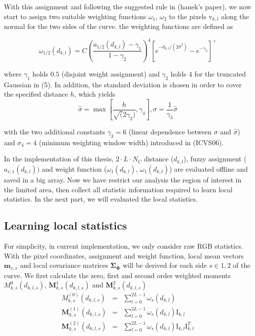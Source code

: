 With this assignment and following the suggested rule in (hanek's
paper), we now start to assign two suitable weighting functions
$\omega_1$, $\omega_2$ to the pixels $\mathrm{v}_{k,l}$ along the
normal for the two sides of the curve. the weighting functions are
defined as

\begin{equation}
  \label{eq:5.10}
  \omega_{1/2}(d_{k,l}) = C\left(\frac{a_{1/2}(d_{k,l}) -
    \gamma_1}{1-\gamma_2}\right)^4 \left[e^{-d_{k,l}/(2\hat{\sigma}^2)} - e^{-\gamma_2}\right]^+
\end{equation}

where $\gamma_1$ holds $0.5$ (disjoint weight assignment) and $\gamma_2$
holds $4$ for the truncated Gaussian in (5). In addition, the standard
deviation is chosen in order to cover the specified distance $h$,
which yields 
\begin{equation}
  \label{eq:5.11}
  \hat{\sigma} = \max \left[\frac{h}{\sqrt(2\gamma_2)}, \gamma_4
  \right], \sigma  = \frac{1}{\gamma_3} \hat{\sigma}
\end{equation}

with the two additional constants $\gamma_3 = 6$ (linear dependence
between $\sigma$ and $\hat{\sigma}$) and $\sigma_4 = 4$ (minimum
weighting window width) introduced in (ICVS06). 

In the implementation of this thesis,
$2 \cdot L \cdot N_C$ distance ($d_{k,l}$), fuzzy assignment
($a_{v,1}(d_{k,l}))$ and weight function ($\omega_1(d_{k,l})$,
$\omega_1(d_{k,l})$) are evaluated offline and saved in a big
array. Now we have restrict our analysis the region of interest in the
limited area, then collect all statistic information required to learn
local statistics. In the next part, we will evaluated the local
statistics.

\subsection{Learning local statistics}
\label{sec:lls}

For simplicity, in current implementation, we only consider raw RGB
statistics. With the pixel coordinates, assignment and weight
function, local mean vectors $\mathbf{m}_{v,s}$  and local covariance matrices
$\mathbf{\Sigma}_{\mathbf{\Phi}}$ will be derived for each side $s \in
{1,2}$ of the curve.
We first calculate the zero, first and second order weighted moments
$M_{k,s}^0(d_{k,l,s})$, $\mathbf{M}_{k,s}^1(d_{k,l,s})$ and $\mathbf{M}_{k,s}^2(d_{k,l,s})$
\begin{eqnarray}
  \label{eq:5.13}
  M_{k,s}^{(0)}(d_{k,l,s}) &=& \sum_{l=0}^{2L-1} \omega_s(d_{k,l})\\
  \mathbf{M}_{k,s}^{(1)}(d_{k,l,s}) &=& \sum_{l=0}^{2L-1} \omega_s(d_{k,l}) \mathrm{I}_{k,l}\\
  \mathbf{M}_{k,s}^{(2)}(d_{k,l,s}) &=& \sum_{l=0}^{2L-1} \omega_s(d_{k,l}) \mathrm{I}_{k,l}\mathrm{I}_{k,l}^T
\end{eqnarray}

